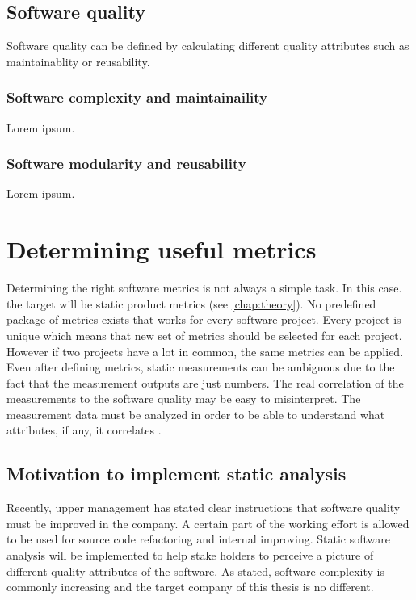 \section{Software quality}
\label{chap:quality}

Software quality can be defined by calculating different quality attributes such as maintainablity or reusability.

\subsection{Software complexity and maintainaility}

Lorem ipsum.

\subsection{Software modularity and reusability}

Lorem ipsum.



\chapter{Determining useful metrics}

Determining the right software metrics is not always a simple task. In this case. the target will be static product metrics (see \autoref{chap:theory}). No predefined package of metrics exists that works for every software project. Every project is unique which means that new set of metrics should be selected for each project. However if two projects have a lot in common, the same metrics can be applied. Even after defining metrics, static measurements can be ambiguous due to the fact that the measurement outputs are just numbers. The real correlation of the measurements to the software quality may be easy to misinterpret. The measurement data must be analyzed in order to be able to understand what attributes, if any, it correlates \cite{sommerville2011software}. 

\section{Motivation to implement static analysis}

Recently, upper management has stated clear instructions that software quality must be improved in the company. A certain part of the working effort is allowed to be used for source code refactoring and internal improving. Static software analysis will be implemented to help stake holders to perceive a picture of different quality attributes of the software. As stated, software complexity is commonly increasing and the target company of this thesis is no different. 

